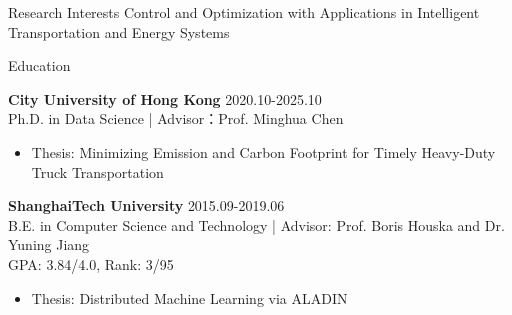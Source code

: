 \documentclass{resume} %
\begin{document}



\begin{rSection}{Research Interests}
        {
        Control and Optimization with Applications in Intelligent Transportation and Energy Systems
        }
\end{rSection}


\begin{rSection}{Education}



\textbf{City University of Hong Kong}  \hfill {2020.10-2025.10} 
\\ Ph.D. in Data Science | Advisor：Prof. Minghua Chen 
\begin{itemize}
    \item Thesis: Minimizing Emission and Carbon Footprint for Timely Heavy-Duty Truck Transportation
\end{itemize}

\textbf{ShanghaiTech University}  \hfill {2015.09-2019.06} 
\\ B.E. in Computer Science and Technology | Advisor: Prof. Boris Houska and Dr. Yuning Jiang
\\ GPA: 3.84/4.0, Rank: 3/95
\begin{itemize}
        \item Thesis: Distributed Machine Learning via ALADIN
\end{itemize}

\end{rSection}
\end{document}
